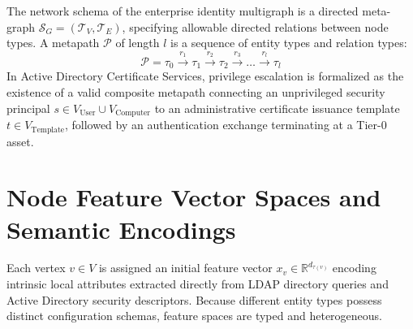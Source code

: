 \begin{definition}
The network schema of the enterprise identity multigraph is a directed meta-graph $\mathcal{S}_G = (\mathcal{T}_V, \mathcal{T}_E)$, specifying allowable directed relations between node types. A metapath $\mathcal{P}$ of length $l$ is a sequence of entity types and relation types:
\begin{equation}
\mathcal{P} = \tau_0 \xrightarrow{r_1} \tau_1 \xrightarrow{r_2} \tau_2 \xrightarrow{r_3} \dots \xrightarrow{r_l} \tau_l
\end{equation}
In Active Directory Certificate Services, privilege escalation is formalized as the existence of a valid composite metapath connecting an unprivileged security principal $s \in V_{\text{User}} \cup V_{\text{Computer}}$ to an administrative certificate issuance template $t \in V_{\text{Template}}$, followed by an authentication exchange terminating at a Tier-0 asset.
\end{definition}

\section{Node Feature Vector Spaces and Semantic Encodings}
Each vertex $v \in V$ is assigned an initial feature vector $x_v \in \mathbb{R}^{d_{\tau(v)}}$ encoding intrinsic local attributes extracted directly from LDAP directory queries and Active Directory security descriptors. Because different entity types possess distinct configuration schemas, feature spaces are typed and heterogeneous.

